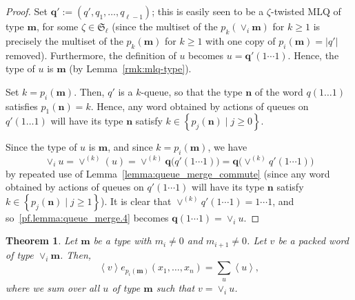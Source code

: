 \documentclass[reqno]{amsart}
\newcommand{\0}{\phantom{c}}
\newcommand{\swt}[1]{\left\langle #1 \right\rangle} %
\newcommand{\merge}[1]{\vee_{#1}} %
\newcommand{\SymGp}[1]{\mathfrak{S}_{#1}} %
\newcommand{\mm}{\mathbf{m}}
\newcommand{\nn}{\mathbf{n}}
\newcommand{\qq}{\mathbf{q}}
\let\sumnonlimits\sum
\renewcommand{\sum}{\sumnonlimits\limits}
\newcommand{\set}[1]{\left\{ #1 \right\}}
\newcommand{\abs}[1]{\left| #1 \right|}
\newcommand{\tup}[1]{\left( #1 \right)}
\theoremstyle{plain}
\newtheorem{thm}{Theorem}[section]
\theoremstyle{definition}
\numberwithin{equation}{section}
\begin{document}
\begin{proof}
Set $\qq' := \tup{q', q_1, \ldots, q_{\ell-1}}$; this is easily
seen to be a $\zeta$-twisted MLQ of type $\mm$, for some
$\zeta \in \SymGp{\ell}$
(since the multiset of the $p_k(\merge{i}\mm)$ for $k \geq 1$
is precisely the multiset of the $p_k(\mm)$ for $k \geq 1$
with one copy of $p_i(\mm) = \abs{q'}$ removed).
Furthermore, the definition of $u$ becomes $u = \qq' (1 \dotsm 1)$.
Hence, the type of $u$ is $\mm$ (by Lemma~\ref{rmk:mlq-type}).

Set $k = p_i(\mm)$. Then, $q'$ is a $k$-queue, so that the type
$\nn$ of the word $q(1 \dots 1)$ satisfies $p_1(\nn) = k$.
Hence, any word obtained by actions of queues on $q'(1 \dots 1)$
will have its type $\nn$ satisfy
$k \in \set{ p_j(\nn) \mid j \geq 0 } $.

Since the type of $u$ is $\mm$, and since $k = p_i(\mm)$, we have
\begin{equation}
\label{pf.lemma:queue_merge.4}
 \merge{i} u = \vee^{(k)} (u) = \vee^{(k)} \qq\bigl( q' (1 \dotsm 1) \bigr) = \qq\bigl( \vee^{(k)} q' (1 \dotsm 1) \bigr)
\end{equation}
by repeated use of Lemma~\ref{lemma:queue_merge_commute}
(since any word obtained by actions of queues on $q'(1 \dotsm 1)$
will have its type $\nn$ satisfy
$k \in \set{ p_j(\nn) \mid j \geq 1 } $).
It is clear that $\vee^{(k)} q'(1 \dotsm 1) = 1 \dotsm 1$,
and so~\eqref{pf.lemma:queue_merge.4} becomes $\qq(1 \dotsm 1) = \merge{i} u$.
\end{proof}

\begin{thm}
\label{thm:merge}
  Let $\mm$ be a type with $m_i \neq 0$ and $m_{i+1} \neq 0$.
  Let $v$ be a packed word of type $\merge{i}\mm$.
  Then,
  \[
  \swt{v} e_{p_i(\mm)}(x_1, \dotsc, x_n) = \sum_u \swt{u},
  \]
where we sum over all $u$ of type $\mm$ such that $v = \merge{i} u$.
\end{thm}
\end{document}
